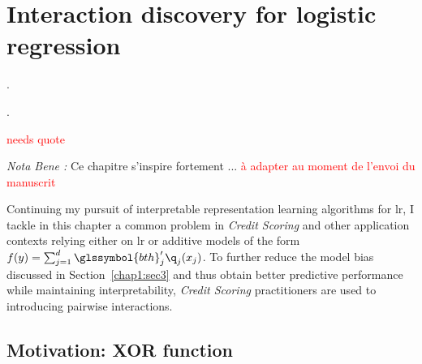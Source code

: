 \chapter{Interaction discovery for logistic regression} \label{chap5}

\epigraph{.}{.}

\minitoc


\textcolor{red}{needs quote}

\textit{Nota Bene :} Ce chapitre s'inspire fortement ... \textcolor{red}{à adapter au moment de l'envoi du manuscrit}

\bigskip


Continuing my pursuit of interpretable representation learning algorithms for \gls{lr}, I tackle in this chapter a common problem in \textit{Credit Scoring} and other application contexts relying either on \gls{lr} or additive models of the form $f(y) = \sum_{j=1}^d \glssymbol{bth}_j' \q_j(x_j)$. To further reduce the model bias discussed in Section~\ref{chap1:sec3} and thus obtain better predictive performance while maintaining interpretability, \textit{Credit Scoring} practitioners are used to introducing pairwise interactions.


\section{Motivation: XOR function}


